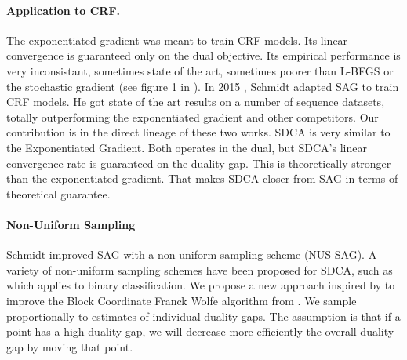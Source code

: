 \documentclass{article}
\DeclareMathOperator{\1}{\mathbb{1}}
\begin{document}
\paragraph{Application to CRF.}
The exponentiated gradient was meant to train CRF models.
Its linear convergence is guaranteed only on the dual objective.
Its empirical performance is very inconsistant, sometimes state of the art, sometimes poorer than L-BFGS or the stochastic gradient (see figure 1 in \cite{schmidt_non-uniform_2015}). 
In 2015 \cite{schmidt_non-uniform_2015}, Schmidt adapted SAG to train CRF models.
He got state of the art results on a number of sequence datasets, totally outperforming the exponentiated gradient and other competitors.
Our contribution is in the direct lineage of these two works.
SDCA is very similar to the Exponentiated Gradient.
Both operates in the dual, but SDCA's linear convergence rate is  guaranteed on the duality gap.
This is theoretically stronger than the exponentiated gradient.
That makes SDCA closer from SAG in terms of theoretical guarantee.

\paragraph{Non-Uniform Sampling}
Schmidt improved SAG with a non-uniform sampling scheme (NUS-SAG).
A variety of non-uniform sampling schemes have been proposed for SDCA, such as \cite{csiba_stochastic_2015} which applies to binary classification.
We propose a new approach inspired by \cite{osokin_minding_2016} to improve the Block Coordinate Franck Wolfe algorithm from \cite{lacoste-julien_block-coordinate_2012}.
We sample proportionally to estimates of individual duality gaps.
The assumption is that if a point has a high duality gap, we will decrease more efficiently  the overall duality gap by moving that point. 
\end{document}
